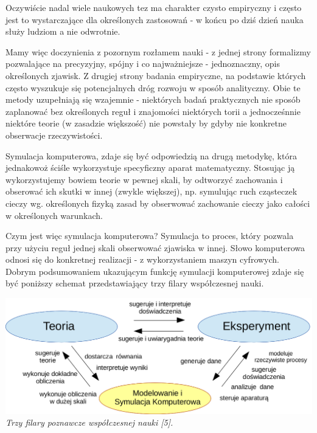 \par{
Oczywiście nadal wiele naukowych tez ma charakter czysto empiryczny i często jest to wystarczające dla określonych zastosowań - w końcu po dziś dzień nauka służy ludziom a nie odwrotnie.
}

\par{
Mamy więc doczynienia z pozornym rozłamem nauki - z jednej strony formalizmy pozwalające na precyzyjny, spójny i co najważniejsze - jednoznaczny, opis określonych zjawisk. Z drugiej strony badania empiryczne, na podstawie których często wyszukuje się potencjalnych dróg rozwoju w sposób analityczny. Obie te metody uzupełniają się wzajemnie - niektórych badań praktycznych nie sposób zaplanować bez określonych reguł i znajomości niektórych torii a jednocześnnie niektóre teorie (w zasadzie większość) nie powstały by gdyby nie konkretne obserwacje rzeczywistości.
}

\par{
Symulacja komputerowa, zdaje się być odpowiedzią na drugą metodykę, która jednakowoż ściśle wykorzystuje specyficzny aparat matematyczny. Stosując ją wykorzystujemy bowiem teorie w pewnej skali, by odtworzyć zachowania i obserować ich skutki w innej (zwykle większej), np. symulując ruch cząsteczek cieczy wg. określonych fizyką zasad by obserwować zachowanie cieczy jako całości w określonych warunkach.
}

\par{
Czym jest więc symulacja komputerowa? Symulacja to proces, który pozwala przy użyciu reguł jednej skali obserwować zjawiska w innej. Słowo komputerowa odnosi się do konkretnej realizacji - z wykorzystaniem maszyn cyfrowych. Dobrym podsumowaniem ukazującym funkcję symulacji komputerowej zdaje się być poniższy schemat przedstawiający trzy filary współczesnej nauki.
\begin{center}
\includegraphics[width=\textwidth,keepaspectratio]{img/triada_poznania}
\textit{Trzy filary poznawcze współczesnej nauki [5].}
\end{center}
}

